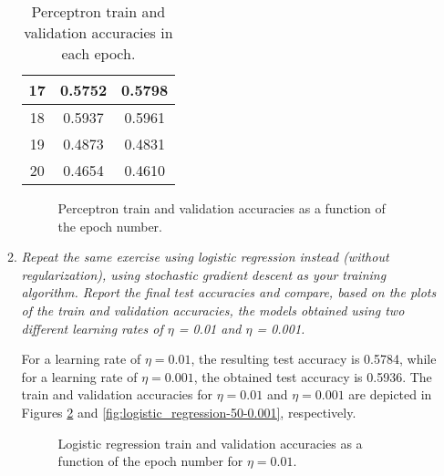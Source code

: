 \documentclass[12pt]{article}
\begin{document}
\begin{enumerate}[leftmargin=\labelsep]
\begin{enumerate}[label=\alph*)]
\begin{table}[H]
\begin{tabular}{|c|c|c|}
                            17             & 0.5752             & 0.5798                  \\ \hline
                            18             & 0.5937             & 0.5961                  \\ \hline
                            19             & 0.4873             & 0.4831                  \\ \hline
                            20             & 0.4654             & 0.4610                  \\ \hline
                        \end{tabular}
                        \caption{Perceptron train and validation accuracies in each epoch.}
                        \label{tab:perceptron-20-1.0}
                    \end{table}

                    \begin{figure}[H]
                        \centering
                        
                        \caption{Perceptron train and validation accuracies as a function of the epoch number.}
                        \label{fig:perceptron-20-1.0}
                    \end{figure}

                    \vspace{12pt}

              \item \textit{Repeat the same exercise using logistic regression instead (without regularization), using stochastic gradient descent as your training algorithm.  Report the final test accuracies and compare, based on the plots of the train and validation accuracies, the models obtained using two different learning rates of $\eta$ = 0.01 and $\eta$ = 0.001.}

                    \vspace{12pt}

                    For a learning rate of $\eta = 0.01$, the resulting test accuracy is 0.5784, while for a learning rate of $\eta = 0.001$, the obtained test accuracy is 0.5936. The train and validation accuracies for $\eta = 0.01$ and $\eta = 0.001$ are depicted in Figures \ref{fig:logistic_regression-50-0.01} and \ref{fig:logistic_regression-50-0.001}, respectively.

                    \begin{figure}[H]
                        \centering
                        
                        \caption{Logistic regression train and validation accuracies as a function of the epoch number for $\eta = 0.01$.}
                        \label{fig:logistic_regression-50-0.01}
                    \end{figure}


\end{enumerate}
\end{enumerate}
\end{document}

